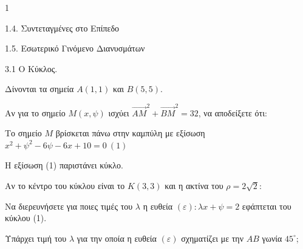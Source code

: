 \begin{ylh}{1}
    \item 1.4. Συντεταγμένες στο Επίπεδο
    \item 1.5. Εσωτερικό Γινόμενο Διανυσμάτων
    \item 3.1 Ο Κύκλος.
\end{ylh}
Δίνονται τα σημεία $A(1,1)$ και $B(5,5)$.
\begin{alist}
\item Αν για το σημείο $M(x, \psi)$ ισχύει $\overrightarrow{AM}^2 + \overrightarrow{BM}^2 = 32$, να αποδείξετε ότι:
    \begin{rlist}
    \item Το σημείο $M$ βρίσκεται πάνω στην καμπύλη με εξίσωση $x^2 + \psi^2 - 6\psi - 6x + 10 = 0 \ (1)$ 
    \item Η εξίσωση (1) παριστάνει κύκλο. 
    \end{rlist}
\item Αν το κέντρο του κύκλου είναι το $K(3,3)$ και η ακτίνα του $\rho = 2\sqrt{2}$:
    \begin{rlist}
    \item Να διερευνήσετε για ποιες τιμές του $\lambda$ η ευθεία $(\varepsilon): \lambda x + \psi = 2$ εφάπτεται του κύκλου (1). 
    \item Υπάρχει τιμή του $\lambda$ για την οποία η ευθεία $(\varepsilon)$ σχηματίζει με την $AB$ γωνία $45^\circ$; 
    \end{rlist}
\end{alist}
